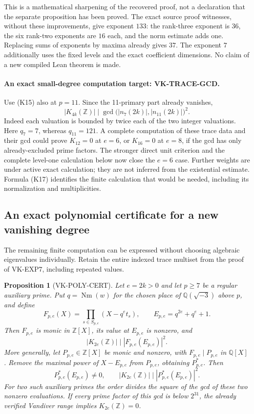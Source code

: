 \documentclass[11pt,a4paper]{article}
\newtheorem{proposition}[theorem]{Proposition}
\theoremstyle{definition}
\begin{document}
This is a mathematical sharpening of the recovered proof,
not a declaration that the separate proposition
 has been proved.
The exact source proof witnesses, without these improvements,
give exponent \(133\): the rank-three exponent is \(36\),
the six rank-two exponents are \(16\) each, and the norm
estimate adds one. Replacing sums of exponents by maxima
already gives \(37\). The exponent \(7\) additionally uses
the fixed levels and the exact coefficient dimensions.
No claim of a new compiled Lean theorem is made.

\paragraph{An exact small-degree computation target: VK-TRACE-GCD.}
Use (K15) also at \(p=11\). Since the 11-primary part
already vanishes,
\[
 |K_{4k}(\mathbb Z)|
 \mid \gcd\bigl(|n_7(2k)|,|n_{11}(2k)|\bigr)^2.       \tag{K17}
\]
Indeed each valuation is bounded by twice each of the two
integer valuations. Here \(q_7=7\), whereas \(q_{11}=121\).
A complete computation of these trace data and their gcd
could prove \(K_{12}=0\) at \(e=6\), or \(K_{16}=0\)
at \(e=8\), if the gcd has only already-excluded prime factors.
The stronger direct unit criterion and the complete level-one calculation
below now close the $e=6$ case. Further weights are under active exact
calculation; they are not inferred from the existential estimate.
Formula (K17) identifies the finite calculation that would
be needed, including its normalization and multiplicities.

\subsection{An exact polynomial certificate for a new vanishing degree}

The remaining finite computation can be expressed without choosing
algebraic eigenvalues individually. Retain the entire indexed trace
multiset from the proof of VK-EXP7, including repeated values.

\begin{proposition}[VK-POLY-CERT]
Let $e=2k>0$ and let $p\ge7$ be a regular auxiliary prime. Put
$q=\operatorname{Nm}(w)$ for the chosen place of
$\mathbb Q(\sqrt{-3})$ above $p$, and define
\[
 F_{p,e}(X)=\prod_{s\in S_{p,e}}(X-q^e t_s),\qquad
 E_{p,e}=q^{2e}+q^e+1.
\]
Then $F_{p,e}$ is monic in $\mathbb Z[X]$, its value at $E_{p,e}$
is nonzero, and
\[
 |K_{2e}(\mathbb Z)|\mid |F_{p,e}(E_{p,e})|^2.
 \tag{K18a}
\]
More generally, let $P_{p,e}\in\mathbb Z[X]$ be monic and nonzero,
with $F_{p,e}\mid P_{p,e}$ in $\mathbb Q[X]$. Remove the maximal
power of $X-E_{p,e}$ from $P_{p,e}$, obtaining $P^*_{p,e}$.
Then
\[
 P^*_{p,e}(E_{p,e})\ne0,\qquad
 |K_{2e}(\mathbb Z)|\mid |P^*_{p,e}(E_{p,e})|^2.
 \tag{K18b}
\]
For two such auxiliary primes the order divides the square of the
gcd of these two nonzero evaluations. If every prime factor of this
gcd is below $2^{31}$, the already verified Vandiver range implies
$K_{2e}(\mathbb Z)=0$.
\end{proposition}
\end{document}
